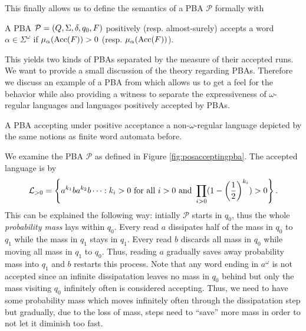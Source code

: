 This finally allows us to define the semantics of a \ac{PBA} $\mathcal{P}$
formally with
\begin{definition}
  A \ac{PBA} $\mathcal{P} = \left(Q, \Sigma, \delta, q_{0}, F\right)$ positively 
  (resp. almost-surely) accepts a word $\alpha\in\Sigma^{\omega}$ if
  $\mu_{\alpha}(\operatorname{Acc}(F)) > 0$ (resp. $\mu_{\alpha}(\operatorname{Acc}(F))$).
\end{definition}
This yields two kinds of \acp{PBA} separated by the measure of their accepted 
runs. We want to provide a small discussion of the theory regarding \acp{PBA}.
Therefore we discuss an example of a \ac{PBA} from \cite{RecOmeLangProbAuto} 
which allows us to get a feel for the behavior while also providing a witness 
to separate the expressiveness of $\omega$-regular languages and languages 
positively accepted by \acp{PBA}.
\begin{drawing}
  \caption{A \ac{PBA} accepting under positive acceptance a 
  non-$\omega$-regular language depicted by the same notions as finite word 
  automata before.}
  \label{fig:posacceptingpba}
  \begin{center}
  \end{center}
\end{drawing}
\begin{example}
  We examine the \ac{PBA} $\mathcal{P}$ as defined in Figure 
  \ref{fig:posacceptingpba}. The accepted language is by 
  \cite{RecOmeLangProbAuto}
  \begin{equation*}
    \mathcal{L}_{>0} = \left\{a^{k_{1}}ba^{k_{2}}b\dots:k_{i}>0\text{ for all }
    i>0\text{ and } \prod_{i>0}(1-\left(\frac{1}{2}\right)^{k_{i}}) > 0\right\}.
  \end{equation*}
  This can be explained the following way: intially $\mathcal{P}$ starts in 
  $q_{0}$, thus the whole \emph{probability mass} lays within $q_{0}$. Every
  read $a$ dissipates half of the mass in $q_{0}$ to $q_{1}$ while the mass in
  $q_{1}$ stays in $q_{1}$. Every read $b$ discards all mass in $q_{0}$ while
  moving all mass in $q_{1}$ to $q_{0}$. Thus, reading $a$ gradually saves away
  probability mass into $q_{1}$ and $b$ restarts this process. Note that any 
  word ending in $a^{\omega}$ is not accepted since an infinite dissipatation 
  leaves no mass in $q_{0}$ behind but only the mass visiting $q_{0}$ 
  infinitely often is considered accepting. Thus, we need to have some 
  probability mass which moves infinitely often through the dissipatation step 
  but gradually, due to the loss of mass, steps need to \enquote{save} more 
  mass in order to not let it diminish too fast.
  \label{ex:posacceptingpba}
\end{example}
